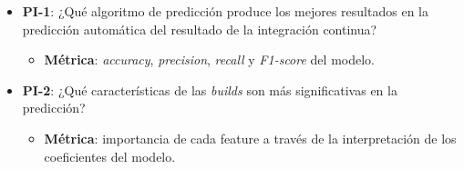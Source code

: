 \begin{itemize}
    \item \textbf{PI-1}: ¿Qué algoritmo de predicción produce los mejores resultados en la
          predicción automática del resultado de la integración continua?\\
          \begin{itemize}
            \item \textbf{Métrica}: \textit{accuracy}, \textit{precision}, \textit{recall} y
                  \textit{F1-score} del modelo.\\
          \end{itemize}

    \item \textbf{PI-2}: ¿Qué características de las \textit{builds} son más significativas en
          la predicción?\\

          \begin{itemize}
            \item \textbf{Métrica}: importancia de cada feature a través de la interpretación de los
                  coeficientes del modelo.
          \end{itemize}

\end{itemize}
